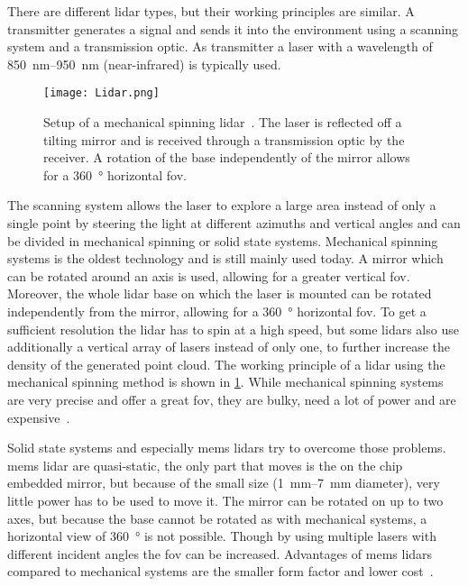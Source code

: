There are different \gls{lidar} types, but their working principles are similar.
A transmitter generates a signal and sends it into the environment using a scanning system and a transmission optic.
As transmitter a laser with a wavelength of \SIrange{850}{950}{\nano\metre} (near-infrared) is typically used.
\begin{figure}[b]
    \centering
    \texttt{[image: Lidar.png]}
    \caption[Setup of a mechanical spinning ]{Setup of a mechanical spinning \acrshort{lidar}~\cite{Li2020}. The laser is reflected off a tilting mirror and is received through a transmission optic by the receiver. A rotation of the base independently of the mirror allows for a \SI{360}{\degree} horizontal \acrshort{fov}.}
    \label{fig:lidar}
\end{figure}
The scanning system allows the laser to explore a large area instead of only a single point by steering the light at different azimuths and vertical angles and can be divided in mechanical spinning or solid state systems.
Mechanical spinning systems is the oldest technology and is still mainly used today.
A mirror which can be rotated around an axis is used, allowing for a greater vertical \gls{fov}.
Moreover, the whole \gls{lidar} base on which the laser is mounted can be rotated independently from the mirror, allowing for a \SI{360}{\degree} horizontal \gls{fov}.
To get a sufficient resolution the \gls{lidar} has to spin at a high speed, but some \glspl{lidar} also use additionally a vertical array of lasers instead of only one, to further increase the density of the generated point cloud.
The working principle of a \gls{lidar} using the mechanical spinning method is shown in \cref{fig:lidar}.
While mechanical spinning systems are very precise and offer a great \gls{fov}, they are bulky, need a lot of power and are expensive~\cite{Fujii2005}.

Solid state systems and especially \gls{mems} \glspl{lidar} try to overcome those problems.
\gls{mems} \gls{lidar} are quasi-static, the only part that moves is the on the chip embedded mirror, but because of the small size (\SIrange{1}{7}{\milli\metre} diameter), very little power has to be used to move it.
The mirror can be rotated on up to two axes, but because the base cannot be rotated as with mechanical systems, a horizontal view of \SI{360}{\degree} is not possible.
Though by using multiple lasers with different incident angles the \gls{fov} can be increased.
Advantages of \gls{mems} \glspl{lidar} compared to mechanical systems are the smaller form factor and lower cost~\cite{Wang2020}.

